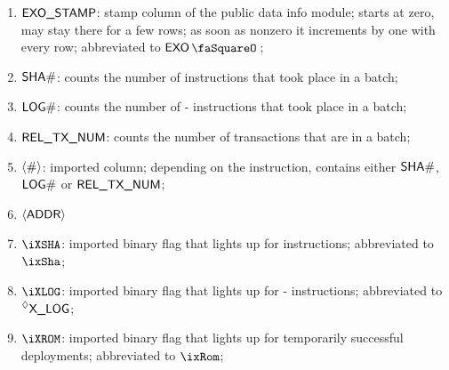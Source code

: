 \begin{enumerate}
	\item $\textsf{EXO\_STAMP}{}$: stamp column of the public data info module; starts at zero, may stay there for a few rows; as soon as nonzero it increments by one with every row; abbreviated to $\exoStamp{}$;
	\item $\textsf{SHA\#}$: counts the number of  instructions that took place in a batch;
	\item $\textsf{LOG\#}$: counts the number of - instructions that took place in a batch;
	\item $\textsf{REL\_TX\_NUM}$: counts the number of transactions that are in a batch;
	\item $\langle{}\#\rangle{}$: imported column; depending on the instruction, contains either $\textsf{SHA\#}$, $\textsf{LOG\#}$ or $\textsf{REL\_TX\_NUM}$;
	\item $\langle{}\textsf{ADDR}\rangle{}$
	\item $\iXSHA$: imported binary flag that lights up for  instructions; abbreviated to $\ixSha$;
	\item $\iXLOG$: imported binary flag that lights up for - instructions; abbreviated to $\prescript{\lozenge}{}{\textsf{X\_LOG}}$;
	\item $\iXROM$: imported binary flag that lights up for temporarily successful deployments; abbreviated to $\ixRom$;
\end{enumerate}


